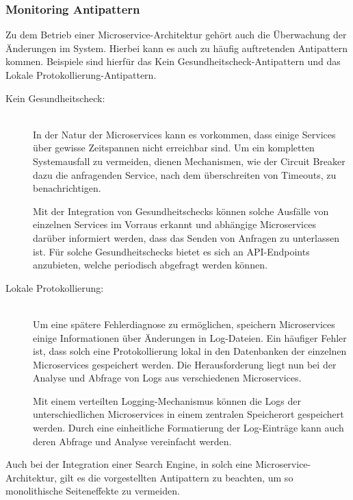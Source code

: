 \subsubsection*{Monitoring Antipattern}

Zu dem Betrieb einer Microservice-Architektur gehört auch die Überwachung der Änderungen im System. Hierbei kann es auch zu häufig auftretenden Antipattern kommen. Beispiele sind hierfür das \glqq Kein Gesundheitscheck\grqq{}-Antipattern und das \glqq Lokale Protokollierung\grqq{}-Antipattern.

\begin{description}
    \item[Kein Gesundheitscheck:]\hfill \\
    In der Natur der Microservices kann es vorkommen, dass einige Services über gewisse Zeitspannen nicht erreichbar sind. Um ein kompletten Systemausfall zu vermeiden, dienen Mechanismen, wie der Circuit Breaker dazu die anfragenden Service, nach dem überschreiten von Timeouts, zu benachrichtigen.

    Mit der Integration von Gesundheitschecks können solche Ausfälle von einzelnen Services im Vorraus erkannt und abhängige Microservices darüber informiert werden, dass das Senden von Anfragen zu unterlassen ist. Für solche Gesundheitschecks bietet es sich an API-Endpoints anzubieten, welche periodisch abgefragt werden können.
    
    \item[Lokale Protokollierung:]\hfill \\
    Um eine spätere Fehlerdiagnose zu ermöglichen, speichern Microservices einige Informationen über Änderungen in Log-Dateien. Ein häufiger Fehler ist, dass solch eine Protokollierung lokal in den Datenbanken der einzelnen Microservices gespeichert werden. Die Herausforderung liegt nun bei der Analyse und Abfrage von Logs aus verschiedenen Microservices.

    Mit einem verteilten Logging-Mechanismus können die Logs der unterschiedlichen Microservices in einem zentralen Speicherort gespeichert werden. Durch eine einheitliche Formatierung der Log-Einträge kann auch deren Abfrage und Analyse vereinfacht werden.

\end{description}

Auch bei der Integration einer Search Engine, in solch eine Microservice-Architektur, gilt es die vorgestellten Antipattern zu beachten, um so monolithische Seiteneffekte zu vermeiden.